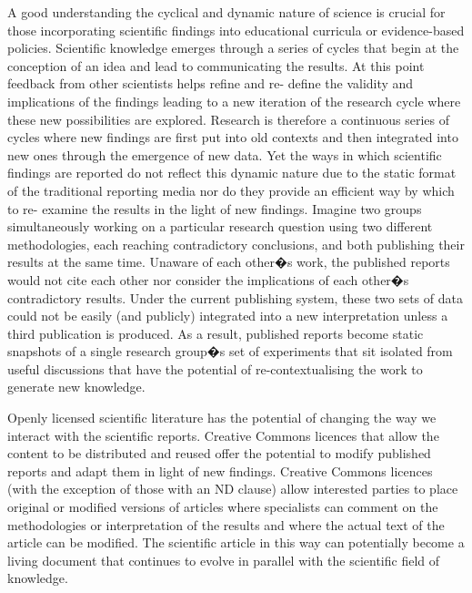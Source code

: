 \documentclass[final,authoryear,3p]{elsarticle-open-drafting}
\begin{document}

A good understanding the cyclical and dynamic nature of science is crucial for those incorporating scientific findings into 
educational curricula or evidence-based policies. Scientific knowledge emerges through a series of cycles that begin at the 
conception of an idea and lead to communicating the results. At this point feedback from other scientists helps refine and re-
define the validity and implications of the findings leading to a new iteration of the research cycle where these new possibilities 
are explored. Research is therefore a continuous series of cycles where new findings are first put into old contexts and then integrated into new ones through the emergence of new data. Yet the ways in which scientific findings are reported do not reflect 
this dynamic nature due to the static format of the traditional reporting media nor do they provide an efficient way by which to re-
examine the results in the light of new findings. Imagine two groups simultaneously working on a particular research question 
using two different methodologies, each reaching contradictory conclusions, and both publishing their results at the same time. 
Unaware of each other�s work, the published reports would not cite each other nor consider the implications of each other�s 
contradictory results. Under the current publishing system, these two sets of data could not be easily (and publicly) integrated into 
a new interpretation unless a third publication is produced. As a result, published reports become static snapshots of a single 
research group�s set of experiments that sit isolated from useful discussions that have the potential of re-contextualising the work 
to generate new knowledge. 

Openly licensed scientific literature has the potential of changing the way we interact with the scientific reports. Creative 
Commons licences that allow the content to be distributed and reused offer the potential to modify published reports and adapt 
them in light of new findings. Creative Commons licences (with the exception of those with an ND clause) allow interested parties 
to place original or modified versions of articles where specialists can comment on the methodologies or interpretation of the 
results and where the actual text of the article can be modified. The scientific article in this way can potentially become a living 
document that continues to evolve in parallel with the scientific field of knowledge. 
\end{document}
